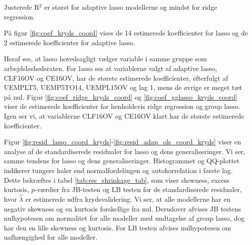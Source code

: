 Justerede R\(^2\) er størst for adaptive lasso modellerne og mindst for ridge regression.
%
%
%

På figur \ref{fig:coef_kryds_coord} vises de 14 estimerede koefficienter for lasso og de 2 estimerede koefficienter for adaptive lasso.

Heraf ses, at lasso hovedsagligt vælger variable i samme gruppe som arbejdsløshedsraten.
For lasso ses at variablerne valgt af adaptive lasso, \textcolor{blue3}{CLF16OV} og \textcolor{blue3}{CE16OV}, har de største estimerede koefficienter, efterfulgt af \textcolor{blue3}{UEMPLT5}, \textcolor{blue3}{UEMP5TO14}, \textcolor{blue3}{UEMPL15OV} og \textcolor{blue3}{lag 1}, mens de øvrige er meget tæt på nul. 
Figur \ref{fig:coef_ridge_kryds_coord} og \ref{fig:coef_gglasso_kryds_coord} viser de estimerede koefficienter for henholdsvis ridge regression og group lasso.
Igen ser vi, at variablerne \textcolor{blue3}{CLF16OV} og \textcolor{blue3}{CE16OV} klart har de største estimerede koefficienter.    
%


Figur \ref{fig:resid_lasso_coord_kryds}-\ref{fig:resid_adap_ols_coord_kryds} viser en analyse af de standardiserede residualer for lasso og dens generaliseringer. 
Vi ser, samme tendens for lasso og dens generaliseringer. Histogrammet og QQ-plottet indikerer tungere haler end normalfordelingen og autokorrelation i første lag.
Dette bekræftes i tabel \ref{tab:res_shrinkage_tab}, som viser skewness, excess kurtosis, $p$-værdier fra JB-testen og LB testen for de standardiserede residualer, hvor $\widehat{\lambda}$ er estimerede udfra krydsvalidering.  
Vi ser, at alle modellerne har en negativ skewness og en kurtosis forskellige fra nul. 
Derudover afvises JB testens nulhypotesen om normalitet for alle modeller med undtagelse af group lasso, dog har den en lille skewness og kurtosis.
For LB testen afvises nulhypotesen om uafhængighed for alle modeller.

